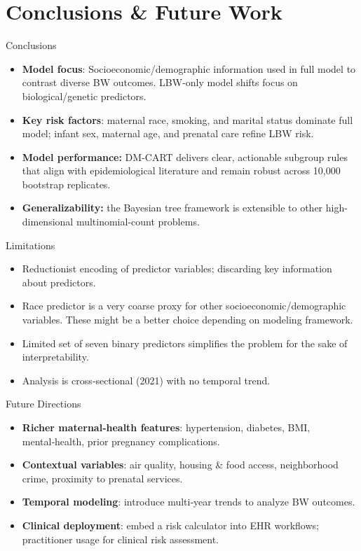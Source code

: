 \documentclass[aspectratio=169,professionalfonts]{beamer}
\begin{document}
\section{Conclusions \& Future Work}

\begin{frame}{Conclusions}
\small
\begin{itemize}
    \item \textbf{Model focus}: Socioeconomic/demographic information used in full model to contrast diverse BW outcomes. LBW-only model shifts focus on biological/genetic predictors. 
  \item \textbf{Key risk factors}: maternal race, smoking, and marital status dominate full model; infant sex, maternal age, and prenatal care refine LBW risk.
  \item \textbf{Model performance:} DM-CART delivers clear, actionable subgroup rules that align with epidemiological literature and remain robust across 10,000 bootstrap replicates.  
  \item \textbf{Generalizability:} the Bayesian tree framework is extensible to other high-dimensional multinomial-count problems.
\end{itemize}
\end{frame}

\begin{frame}{Limitations}
\small
\begin{itemize}
  \item Reductionist encoding of predictor variables; discarding key information about predictors.
  \item Race predictor is a very coarse proxy for other socioeconomic/demographic variables. These might be a better choice depending on modeling framework.
  \item Limited set of seven binary predictors simplifies the problem for the sake of interpretability.
  \item Analysis is cross‑sectional (2021) with no temporal trend.
\end{itemize}
\end{frame}

\begin{frame}{Future Directions}
\small
\begin{itemize}
  \item \textbf{Richer maternal‑health features}: hypertension, diabetes, BMI, mental‑health, prior pregnancy complications.
  \item \textbf{Contextual variables}: air quality, housing \& food access, neighborhood crime, proximity to prenatal services.
  \item \textbf{Temporal modeling}: introduce multi‑year trends to analyze BW outcomes.
  \item \textbf{Clinical deployment}: embed a risk calculator into EHR workflows; practitioner usage for clinical risk assessment.
\end{itemize}
\end{frame}
\end{document}
